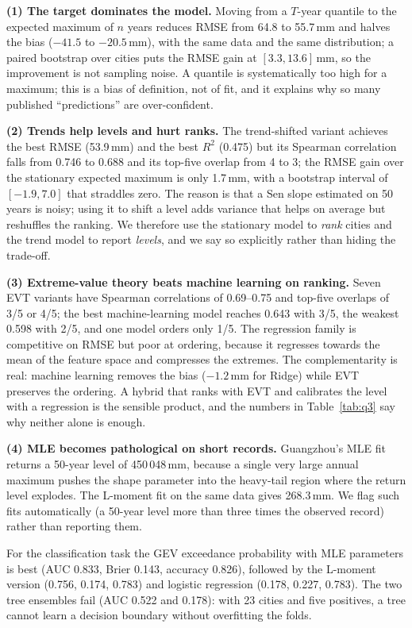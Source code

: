 \textbf{(1) The target dominates the model.} Moving from a $T$-year quantile to the expected maximum of $n$ years reduces RMSE from 64.8 to 55.7\,mm and halves the bias ($-41.5$ to $-20.5$\,mm), with the same data and the same distribution; a paired bootstrap over cities puts the RMSE gain at $[3.3, 13.6]$\,mm, so the improvement is not sampling noise. A quantile is systematically too high for a maximum; this is a bias of definition, not of fit, and it explains why so many published ``predictions'' are over-confident.

\textbf{(2) Trends help levels and hurt ranks.} The trend-shifted variant achieves the best RMSE (53.9\,mm) and the best $R^2$ (0.475) but its Spearman correlation falls from 0.746 to 0.688 and its top-five overlap from 4 to 3; the RMSE gain over the stationary expected maximum is only 1.7\,mm, with a bootstrap interval of $[-1.9, 7.0]$ that straddles zero. The reason is that a Sen slope estimated on 50 years is noisy; using it to shift a level adds variance that helps on average but reshuffles the ranking. We therefore use the stationary model to \emph{rank} cities and the trend model to report \emph{levels}, and we say so explicitly rather than hiding the trade-off.

\textbf{(3) Extreme-value theory beats machine learning on ranking.} Seven EVT variants have Spearman correlations of 0.69--0.75 and top-five overlaps of 3/5 or 4/5; the best machine-learning model reaches 0.643 with 3/5, the weakest 0.598 with 2/5, and one model orders only 1/5. The regression family is competitive on RMSE but poor at ordering, because it regresses towards the mean of the feature space and compresses the extremes. The complementarity is real: machine learning removes the bias ($-1.2$\,mm for Ridge) while EVT preserves the ordering. A hybrid that ranks with EVT and calibrates the level with a regression is the sensible product, and the numbers in Table~\ref{tab:q3} say why neither alone is enough.

\textbf{(4) MLE becomes pathological on short records.} Guangzhou's MLE fit returns a 50-year level of 450\,048\,mm, because a single very large annual maximum pushes the shape parameter into the heavy-tail region where the return level explodes. The L-moment fit on the same data gives 268.3\,mm. We flag such fits automatically (a 50-year level more than three times the observed record) rather than reporting them.

For the classification task the GEV exceedance probability with MLE parameters is best (AUC 0.833, Brier 0.143, accuracy 0.826), followed by the L-moment version (0.756, 0.174, 0.783) and logistic regression (0.178, 0.227, 0.783). The two tree ensembles fail (AUC 0.522 and 0.178): with 23 cities and five positives, a tree cannot learn a decision boundary without overfitting the folds.

